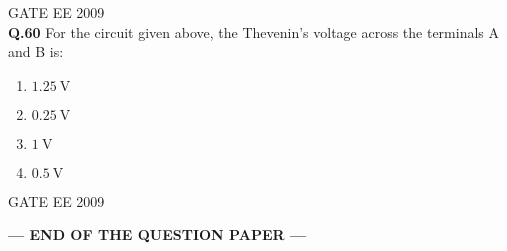 \documentclass[12pt]{article}
\begin{document}
\vspace{0.7cm}
\hspace{10pt}
GATE EE 2009\\
\textbf{Q.60} For the circuit given above, the Thevenin's voltage across the terminals A and B is:

\begin{enumerate}
    

\item  \(1.25 \ \mathrm{V}\) 
\item  \(0.25 \ \mathrm{V}\) 
\item  \(1 \ \mathrm{V}\) 
\item  \(0.5 \ \mathrm{V}\)
\end{enumerate}

\vspace{1cm}
\hspace{10pt}
GATE EE 2009\\
\begin{center}
\textbf{--- END OF THE QUESTION PAPER ---}
\end{center}
\end{document}
